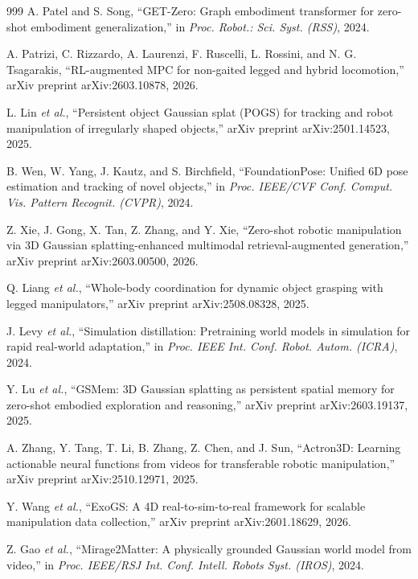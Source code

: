﻿\documentclass[11pt,a4paper]{article}
\begin{document}
\begin{thebibliography}{999}
A. Patel and S. Song, ``{GET-Zero}: Graph embodiment transformer for zero-shot embodiment generalization,'' in \textit{Proc. Robot.: Sci. Syst. (RSS)}, 2024.

A. Patrizi, C. Rizzardo, A. Laurenzi, F. Ruscelli, L. Rossini, and N. G. Tsagarakis, ``RL-augmented MPC for non-gaited legged and hybrid locomotion,'' arXiv preprint arXiv:2603.10878, 2026.

L. Lin \textit{et al.}, ``Persistent object Gaussian splat ({POGS}) for tracking and robot manipulation of irregularly shaped objects,'' arXiv preprint arXiv:2501.14523, 2025.

B. Wen, W. Yang, J. Kautz, and S. Birchfield, ``FoundationPose: Unified 6D pose estimation and tracking of novel objects,'' in \textit{Proc. IEEE/CVF Conf. Comput. Vis. Pattern Recognit. (CVPR)}, 2024.

Z. Xie, J. Gong, X. Tan, Z. Zhang, and Y. Xie, ``Zero-shot robotic manipulation via {3D} Gaussian splatting-enhanced multimodal retrieval-augmented generation,'' arXiv preprint arXiv:2603.00500, 2026.

Q. Liang \textit{et al.}, ``Whole-body coordination for dynamic object grasping with legged manipulators,'' arXiv preprint arXiv:2508.08328, 2025.

J. Levy \textit{et al.}, ``Simulation distillation: Pretraining world models in simulation for rapid real-world adaptation,'' in \textit{Proc. IEEE Int. Conf. Robot. Autom. (ICRA)}, 2024.

Y. Lu \textit{et al.}, ``{GSMem}: {3D} Gaussian splatting as persistent spatial memory for zero-shot embodied exploration and reasoning,'' arXiv preprint arXiv:2603.19137, 2025.

A. Zhang, Y. Tang, T. Li, B. Zhang, Z. Chen, and J. Sun, ``{Actron3D}: Learning actionable neural functions from videos for transferable robotic manipulation,'' arXiv preprint arXiv:2510.12971, 2025.

Y. Wang \textit{et al.}, ``{ExoGS}: A {4D} real-to-sim-to-real framework for scalable manipulation data collection,'' arXiv preprint arXiv:2601.18629, 2026.

Z. Gao \textit{et al.}, ``Mirage2Matter: A physically grounded Gaussian world model from video,'' in \textit{Proc. IEEE/RSJ Int. Conf. Intell. Robots Syst. (IROS)}, 2024.


\end{thebibliography}
\end{document}
